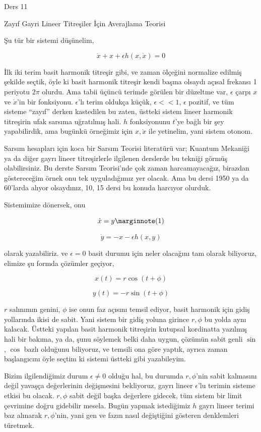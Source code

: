\documentclass[12pt,fleqn]{article}\usepackage{../../common}
\begin{document}
Ders 11

Zayıf Gayri Lineer Titreşiler İçin Averajlama Teorisi

Şu tür bir sistemi düşünelim,

$$ \ddot{x} + x + \epsilon h(x,\dot{x}) = 0 $$

İlk iki terim basit harmonik titreşir gibi, ve zaman ölçeğini normalize edilmiş
şekilde seçtik, öyle ki basit harmonik titreşir kendi başına olsaydı açısal
frekansı 1 periyotu $2\pi$ olurdu. Ama tabii üçüncü terimde görülen bir düzeltme
var, $\epsilon$ çarpı $x$ ve $\dot{x}$'in bir fonksiyonu. $\epsilon$'lı terim
oldukça küçük, $\epsilon << 1$, $\epsilon$ pozitif, ve tüm sisteme ``zayıf''
derken kastedilen bu zaten, üstteki sistem lineer harmonik titreşirin ufak
sarsıma uğratılmış hali. $h$ fonksiyonunu $t$'ye bağlı bir şey yapabilirdik, ama
bugünkü örneğimiz için $x,\dot{x}$ ile yetinelim, yani sistem otonom.

Sarsım hesapları için koca bir Sarsım Teorisi literatürü var; Kuantum Mekaniği
ya da diğer gayrı lineer titreşirlerle ilgilenen derslerde bu tekniği görmüş
olabilirsiniz. Bu derste Sarsım Teorisi'nde çok zaman harcamayacağız, birazdan
göstereceğim örnek onu tek uyguladığımız yer olacak. Ama bu dersi 1950 ya da
60'larda alıyor olsaydınız, 10, 15 dersi bu konuda harcıyor olurduk.

Sistemimize dönersek, onu

$$
\dot{x} = y 
\mlabel{1} 
$$

$$\dot{y} = -x - \epsilon h(x,y)$$

olarak yazabiliriz. ve $\epsilon = 0$ basit durumu için neler olacağını tam
olarak biliyoruz, elimize şu formda çözümler geçiyor,

$$ x(t) = r \cos (t+\phi) $$

$$ y(t) = -r \sin (t+\phi) $$

$r$ salınımın genini, $\phi$ ise onun faz açısını temsil ediyor, basit harmonik
için gidiş yollarında ikisi de sabit. Yani sistem bir gidiş yoluna girince
$r,\phi$ bu yolda aynı kalacak. Üstteki yapılan basit harmonik titreşirin
kutupsal kordinatta yazılmış hali bir bakıma, ya da, şunu söylemek belki daha
uygun, çözümün sabit genli $\sin$, $\cos$ bazlı olduğunu biliyoruz, ve temsili
ona göre yaptık, ayrıca zaman başlangıcını öyle seçtim ki sistemi üstteki gibi
yazabileyim.

Bizim ilgilendiğimiz durum $\epsilon \ne 0$ olduğu hal, bu durumda $r,\phi$'nin
sabit kalmasını değil yavaşça değerlerinin değişmesini bekliyoruz, gayrı lineer
$\epsilon$'lu terimin sisteme etkisi bu olacak. $r,\phi$ sabit değil başka
değerlere gidecek, tüm sistem bir limit çevrimine doğru gidebilir mesela. Bugün
yapmak istediğimiz $h$ gayrı lineer terimi baz alınarak $r,\phi$'nin, yani gen
ve fazın nasıl değiştiğini gösteren denklemleri türetmek.
\end{document}
